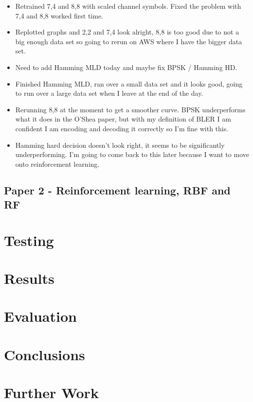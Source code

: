 \documentclass[12pt,onecolumn,letterpaper]{article}
\begin{document}
\begin{itemize}
   \item Retrained 7,4 and 8,8 with scaled channel symbols. Fixed the problem with 7,4 and 8,8 worked first time.
   \item Replotted graphs and 2,2 and 7,4 look alright, 8,8 is too good due to not a big enough data set so going to rerun on AWS where I have the bigger data set.
   \item Need to add Hamming MLD today and maybe fix BPSK / Hamming HD.
   \item Finished Hamming MLD, ran over a small data set and it looks good, going to run over a large data set when I leave at the end of the day.
   \item Rerunning 8,8 at the moment to get a smoother curve. BPSK underperforms what it does in the O'Shea paper, but with my definition of BLER I am confident I am encoding and decoding it correctly so I'm fine with this.
   \item Hamming hard decision doesn't look right, it seems to be significantly underperforming. I'm going to come back to this later because I want to move onto reinforcement learning.
\end{itemize}

\subsection{Paper 2 - Reinforcement learning, RBF and RF}

\FloatBarrier
\section{Testing}

\FloatBarrier
\section{Results}

\FloatBarrier
\section{Evaluation}

\FloatBarrier
\section{Conclusions}


\FloatBarrier
\section{Further Work}
\end{document}
